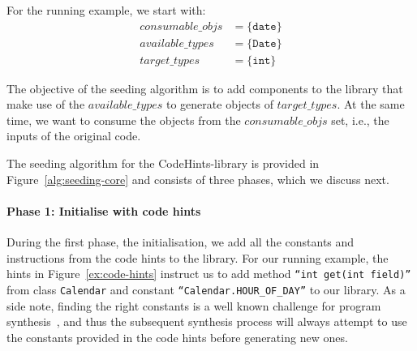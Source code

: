 \documentclass[sigconf,review,anonymous]{acmart}
\begin{document}
For the running example, we start with:
\[
\begin{aligned}
  \mathit{consumable\_objs} &=  \{\texttt{date}\}\\  
  \mathit{available\_types} &=  \{\texttt{Date}\}\\
  \mathit{target\_types} &= \{\texttt{int}\}
\end{aligned}
\]

%

The objective of the seeding algorithm is to
add components to the library that make use of the $\mathit{available\_types}$ to generate objects
of $\mathit{target\_types}$. At the same time, we want to consume the objects from the
$\mathit{consumable\_objs}$ set, i.e., the inputs of the original code.

The seeding algorithm for the CodeHints-library is provided in Figure~\ref{alg:seeding-core} and consists of three phases, which we discuss next.

\paragraph{{\bf Phase 1: Initialise with code hints}}
During the first phase, the initialisation, we add all the constants and instructions from the code hints to the library.
%
For our running example, the hints in Figure~\ref{ex:code-hints} %
instruct us to add method \texttt{``int get(int field)''} from class
\texttt{Calendar} and constant \texttt{``Calendar.HOUR\_OF\_DAY''} to our library.
As a side note, finding the right constants is a well known
challenge for program synthesis~\cite{DBLP:conf/cav/AbateDKKP18}, and thus the subsequent
synthesis process will always attempt to use the constants provided in the code hints before generating new ones.
\end{document}
